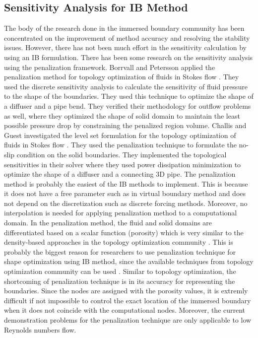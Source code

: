 \subsection{Sensitivity Analysis for IB Method}
The body of the research done in the immersed boundary community has been concentrated on the improvement of method accuracy and resolving the stability issues. However, there has not been much effort in the sensitivity calculation by using an IB formulation. There has been some research on the sensitivity analysis using the penalization framework. Borrvall and Petersson applied the penalization method for topology optimization of fluids in Stokes flow \cite{borrvall2003topology}. They used the discrete sensitivity analysis to calculate the sensitivity of fluid pressure to the shape of the boundaries. They used this technique to optimize the shape of a diffuser and a pipe bend. They verified their methodology for outflow problems as well, where they optimized the shape of solid domain to maintain the least possible pressure drop by constraining the penalized region volume.  Challis and Guest investigated the level set formulation for the topology optimization of fluids in Stokes flow \cite{challis2009level}. They used the penalization technique to formulate the no-slip condition on the solid boundaries. They implemented the topological sensitivities in their solver where they used power dissipation minimization to optimize the shape of a diffuser and a connecting 3D pipe. The penalization method is probably the easiest of the IB methods to implement. This is because it does not have a free parameter such as in virtual boundary method and does not depend on the discretization such as discrete forcing methods. Moreover, no interpolation is needed for applying penalization method to a computational domain. In the penalization method, the fluid and solid domains are differentiated based on a scalar function (porosity) which is very similar to the density-based approaches in the topology optimization community \cite{deaton2014survey}. This is probably the biggest reason for researchers to use penalization technique for shape optimization using IB method, since the available techniques from topology optimization community can be used \cite{leveque1997immersed, pingen2007topology}. Similar to topology optimization, the shortcoming of penalization technique is in its accuracy for representing the boundaries. Since the nodes are assigned with the porosity values, it is extremly difficult if not impossible to control the exact location of the immersed boundary when it does not coincide with the computational nodes. Moreover, the current demonstration problems for the penalization technique are only applicable to low Reynolds numbers flow.

